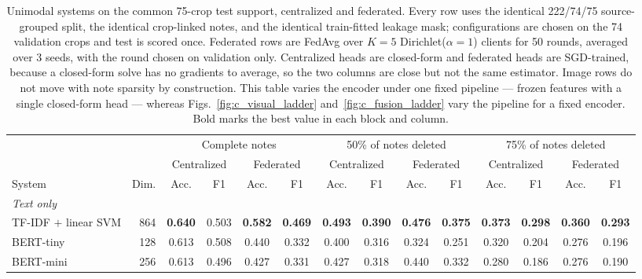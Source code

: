 
\begin{table}[t]
\caption{Unimodal systems on the common 75-crop test support, centralized and federated. Every row uses the identical 222/74/75 source-grouped split, the identical crop-linked notes, and the identical train-fitted leakage mask; configurations are chosen on the 74 validation crops and test is scored once. Federated rows are FedAvg over $K{=}5$ Dirichlet($\alpha{=}1$) clients for 50 rounds, averaged over 3 seeds, with the round chosen on validation only. Centralized heads are closed-form and federated heads are SGD-trained, because a closed-form solve has no gradients to average, so the two columns are close but not the same estimator. Image rows do not move with note sparsity by construction. This table varies the encoder under one fixed pipeline --- frozen features with a single closed-form head --- whereas Figs.~\ref{fig:c_visual_ladder} and~\ref{fig:c_fusion_ladder} vary the pipeline for a fixed encoder. Bold marks the best value in each block and column.}
\label{tab:unimodal_cent_fed}
\centering\footnotesize
\setlength\tabcolsep{4pt}
\begin{tabular}{lrcccccccccccc}
\toprule
 &  & \multicolumn{4}{c}{Complete notes} & \multicolumn{4}{c}{50\% of notes deleted} & \multicolumn{4}{c}{75\% of notes deleted}\\
\cmidrule(lr){3-6}\cmidrule(lr){7-10}\cmidrule(lr){11-14}
 &  & \multicolumn{2}{c}{Centralized} & \multicolumn{2}{c}{Federated} & \multicolumn{2}{c}{Centralized} & \multicolumn{2}{c}{Federated} & \multicolumn{2}{c}{Centralized} & \multicolumn{2}{c}{Federated}\\
\cmidrule(lr){3-4}\cmidrule(lr){5-6}\cmidrule(lr){7-8}\cmidrule(lr){9-10}\cmidrule(lr){11-12}\cmidrule(lr){13-14}
System & Dim. & Acc. & F1 & Acc. & F1 & Acc. & F1 & Acc. & F1 & Acc. & F1 & Acc. & F1\\
\midrule
\multicolumn{14}{l}{\emph{Text only}}\\
TF-IDF $+$ linear SVM & 864 & \textbf{0.640} & 0.503 & \textbf{0.582} & \textbf{0.469} & \textbf{0.493} & \textbf{0.390} & \textbf{0.476} & \textbf{0.375} & \textbf{0.373} & \textbf{0.298} & \textbf{0.360} & \textbf{0.293}\\
BERT-tiny & 128 & 0.613 & 0.508 & 0.440 & 0.332 & 0.400 & 0.316 & 0.324 & 0.251 & 0.320 & 0.204 & 0.276 & 0.196\\
BERT-mini & 256 & 0.613 & 0.496 & 0.427 & 0.331 & 0.427 & 0.318 & 0.440 & 0.332 & 0.280 & 0.186 & 0.276 & 0.190\\

\end{tabular}
\end{table}
